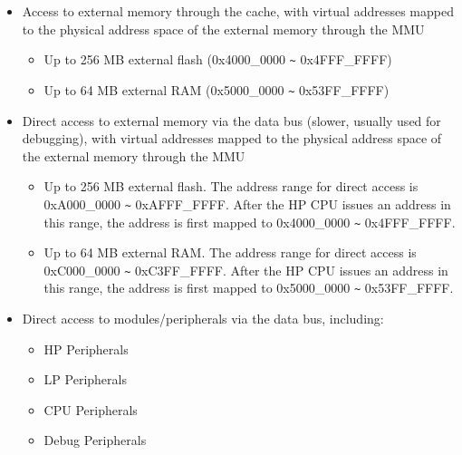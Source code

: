 \documentclass[main\_\_EN.tex]{subfiles}
\begin{document}
\begin{itemize}
\begin{tiplisting}
Software can access the ROM addresses in a cacheable or non-cacheable manner. Cacheable access is performed through the cache; non-cacheable access is direct access without going through the cache. Whether the access is cacheable or non-cacheable is controlled by the CPU PMA (Physical Memory Attribution).
\end{tiplisting}
\item Access to external memory through the cache, with virtual addresses mapped to the physical address space of the external memory through the MMU
    \begin{itemize}
        \item Up to 256 MB external flash (0x4000\_0000 \verb+~+ 0x4FFF\_FFFF)
        \item Up to 64 MB external RAM (0x5000\_0000 \verb+~+ 0x53FF\_FFFF)
    \end{itemize}
\item Direct access to external memory via the data bus (slower, usually used for debugging), with virtual addresses mapped to the physical address space of the external memory through the MMU
    \begin{itemize}
        \item Up to 256 MB external flash. The address range for direct access is 0xA000\_0000 \verb+~+ 0xAFFF\_FFFF. After the HP CPU issues an address in this range, the address is first mapped to 0x4000\_0000 \verb+~+ 0x4FFF\_FFFF.
        \item Up to 64 MB external RAM. The address range for direct access is 0xC000\_0000 \verb+~+ 0xC3FF\_FFFF. After the HP CPU issues an address in this range, the address is first mapped to 0x5000\_0000 \verb+~+ 0x53FF\_FFFF.
    \end{itemize}
\item Direct access to modules/peripherals via the data bus, including:
    \begin{itemize}
        \item HP Peripherals
        \item LP Peripherals
        \item CPU Peripherals
        \item Debug Peripherals
    \end{itemize}
\end{itemize}
\end{document}
